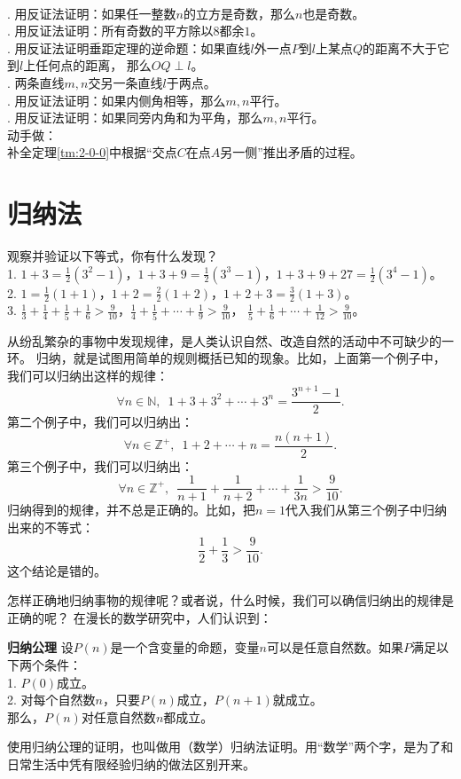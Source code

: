 \begin{xt}
    \mbox{} \\
    . 用反证法证明：如果任一整数$n$的立方是奇数，那么$n$也是奇数。\\
    . 用反证法证明：所有奇数的平方除以$8$都余$1$。\\
    . 用反证法证明垂距定理的逆命题：如果直线$l$外一点$P$到$l$上某点$Q$的距离不大于它到$l$上任何点的距离，
    那么$OQ \perp l$。\\
    . 两条直线$m,n$交另一条直线$l$于两点。\\
    . 用反证法证明：如果内侧角相等，那么$m,n$平行。\\
    . 用反证法证明：如果同旁内角和为平角，那么$m,n$平行。\\
    动手做：\\
    \indent 补全定理\ref{tm:2-0-0}中根据“交点$C$在点$A$另一侧”推出矛盾的过程。
\end{xt}

\section{归纳法}
\begin{ex}\label{ex:2-2-0}
    观察并验证以下等式，你有什么发现？\\
    1. $1 + 3 = \frac12(3^2 - 1)$，$1 + 3 + 9 = \frac12(3^3 - 1)$，$1 + 3 + 9 + 27 = \frac12(3^4 - 1)$。\\
    2. $1 = \frac12(1+1)$，$1 + 2 = \frac22(1 + 2)$，$1 + 2 + 3 = \frac32(1 + 3)$。\\
    3. $\frac13 + \frac14 + \frac15 + \frac16 > \frac{9}{10}$，$\frac14 + \frac15 + \cdots + \frac{1}{9} > \frac{9}{10}$，
    $\frac15 + \frac16 + \cdots + \frac{1}{12} > \frac{9}{10}$。    
\end{ex}
从纷乱繁杂的事物中发现规律，是人类认识自然、改造自然的活动中不可缺少的一环。
归纳，就是试图用简单的规则概括已知的现象。比如，上面第一个例子中，我们可以归纳出这样的规律：
$$ \forall n \in \mathbb{N}, \,\,\, 1 + 3 + 3^2 + \cdots + 3^n = \frac{3^{n+1} - 1}{2}. $$
第二个例子中，我们可以归纳出：
$$ \forall n \in \mathbb{Z}^+, \,\,\, 1 + 2 + \cdots + n = \frac{n(n+1)}{2}. $$
第三个例子中，我们可以归纳出：
$$ \forall n \in \mathbb{Z}^+, \,\,\, \frac{1}{n+1} + \frac{1}{n+2} + \cdots + \frac{1}{3n} > \frac{9}{10}. $$
归纳得到的规律，并不总是正确的。比如，把$n=1$代入我们从第三个例子中归纳出来的不等式：
$$ \frac12 + \frac13 > \frac{9}{10}.$$
这个结论是错的。

怎样正确地归纳事物的规律呢？或者说，什么时候，我们可以确信归纳出的规律是正确的呢？
在漫长的数学研究中，人们认识到：
\begin{po}{\textbf{归纳公理}}
    设$P(n)$是一个含变量的命题，变量$n$可以是任意自然数。如果$P$满足以下两个条件：\\
    1. $P(0)$成立。\\
    2. 对每个自然数$n$，只要$P(n)$成立，$P(n+1)$就成立。\\
    那么，$P(n)$对任意自然数$n$都成立。
\end{po}
使用归纳公理的证明，也叫做用（数学）归纳法证明。用“数学”两个字，是为了和日常生活中凭有限经验归纳的做法区别开来。

